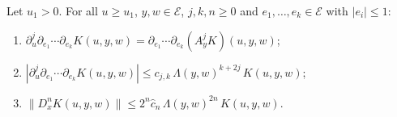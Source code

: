 \begin{auxlemma}\label{c3:kbounds}
Let $u_1>0$. For all $u\ge u_1$, $y,w\in\mathcal E$, $j,k,n\ge0$ and $e_1,\dots,e_k\in\mathcal E$ with $|e_i|\le1$:
\begin{enumerate}[label=(\alph*),itemsep=1pt]
\item $\partial_u^j\partial_{e_1}\cdots\partial_{e_k}K(u,y,w)=\partial_{e_1}\cdots\partial_{e_k}(A_y^jK)(u,y,w)$;
\item $|\partial_u^j\partial_{e_1}\cdots\partial_{e_k}K(u,y,w)|\le c_{j,k}\,\Lambda(y,w)^{k+2j}\,K(u,y,w)$;
\item $\|D^n_xK(u,y,w)\|\le2^n\hat c_n\,\Lambda(y,w)^{2n}\,K(u,y,w)$.
\end{enumerate}
\end{auxlemma}

